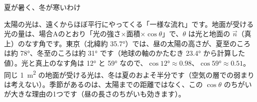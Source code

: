 \begin{column}{夏が暑く、冬が寒いわけ}
\noindent\begin{minipage}[c]{0.64\linewidth}
\raggedright
太陽の光は、遠くからほぼ平行にやってくる「一様な流れ」です。地面が受ける光の量は、場合Aのとおり「光の強さ×面積×$\cos\theta$」で、$\theta$ は光と地面の $\vec n$（真上）のなす角です。東京（北緯約 \ang{35.7}）では、昼の太陽の高さが、夏至のころは約 \ang{78}、冬至のころは約 \ang{31} です（地球の軸のかたむき \ang{23.4} から計算した値）。光と真上のなす角は \ang{12} と \ang{59} なので、$\cos\ang{12}\approx0.98$、$\cos\ang{59}\approx0.51$。同じ \qty{1}{m^2} の地面が受ける光は、冬は夏のおよそ半分です（空気の層での弱まりは考えない）。季節があるのは、太陽までの距離ではなく、この $\cos\theta$ のちがいが大きな理由の1つです（昼の長さのちがいも効きます）。
\end{minipage}\hfill
\begin{minipage}[c]{0.33\linewidth}\centering
{}
\end{minipage}
\end{column}

